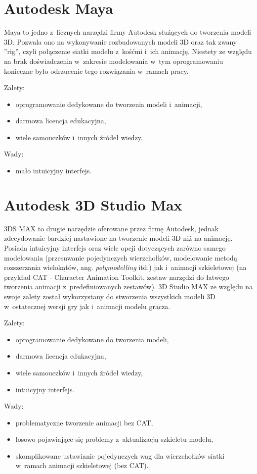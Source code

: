 \section{Autodesk Maya}

Maya to jedno z~licznych narzędzi firmy Autodesk służących do tworzenia modeli 3D. Pozwala ono na wykonywanie rozbudowanych modeli 3D oraz tak zwany ''rig'', czyli połączenie siatki modelu z~kośćmi i~ich animację. Niestety ze względu na brak doświadczenia w~zakresie modelowania w~tym oprogramowaniu konieczne było odrzucenie tego rozwiązania w~ramach pracy.

{\raggedright Zalety:
\begin{itemize}
\item oprogramowanie dedykowane do tworzenia modeli i~animacji,
\item darmowa licencja edukacyjna,
\item wiele samouczków i~innych źródeł wiedzy.
\end{itemize}

Wady:
\begin{itemize}
\item mało intuicyjny interfejs.
\end{itemize}
}

\section{Autodesk 3D Studio Max}

3DS MAX to drugie narzędzie oferowane przez firmę Autodesk, jednak zdecydowanie bardziej nastawione na tworzenie modeli 3D niż na animację. Posiada intuicyjny interfejs oraz wiele opcji dotyczących zarówno samego modelowania (przesuwanie pojedynczych wierzchołków, modelowanie metodą rozszerzania wielokątów, ang. \emph{polymodelling} itd.) jak i~animacji szkieletowej (na przykład CAT - Character Animation Toolkit, zestaw narzędzi do łatwego tworzenia animacji z~predefiniowanych zestawów). 3D Studio MAX ze względu na swoje zalety został wykorzystany do stworzenia wszystkich modeli 3D w~ostatecznej wersji gry jak i~animacji modelu gracza.

{\raggedright Zalety:
\begin{itemize}
\item oprogramowanie dedykowane do tworzenia modeli,
\item darmowa licencja edukacyjna,
\item wiele samouczków i~innych źródeł wiedzy,
\item intuicyjny interfejs.
\end{itemize}

Wady:
\begin{itemize}
\item problematyczne tworzenie animacji bez CAT,
\item losowo pojawiające się problemy z~aktualizacją szkieletu modelu,
\item skomplikowane ustawianie pojedynczych wag dla wierzchołków siatki w~ramach animacji szkieletowej (bez CAT).
\end{itemize}
}

